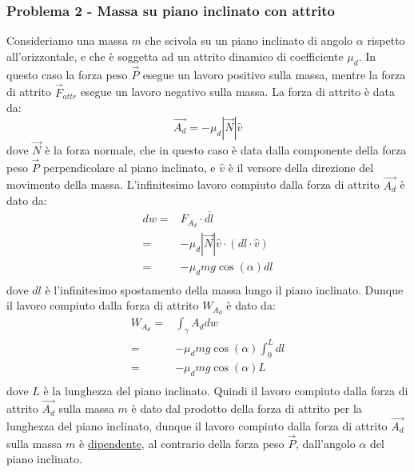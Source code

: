     \subsubsection{Problema 2 - Massa su piano inclinato con attrito}
        Consideriamo una massa $m$ che scivola su un piano inclinato di angolo $\alpha$ rispetto all'orizzontale, e che è soggetta ad un attrito dinamico di coefficiente $\mu_d$.\newline
        In questo caso la forza peso $\vec{P}$ esegue un lavoro positivo sulla massa, mentre la forza di attrito $\vec{F}_{attr}$ esegue un lavoro negativo sulla massa. La forza di attrito è data da:
        $$
            \vec{A_d}= -\mu_d \left|\vec{N}\right|\hat{v}
        $$
        dove $\vec{N}$ è la forza normale, che in questo caso è data dalla componente della forza peso $\vec{P}$ perpendicolare al piano inclinato, e $\hat{v}$ è il versore della direzione del movimento della massa. L'infinitesimo lavoro compiuto dalla forza di attrito $\vec{A_d}$ è dato da:
        $$
            \begin{aligned}
                dw=& F_{A_d} \cdot d\hat{l} \\
                =& -\mu_d \left|\vec{N}\right|\hat{v} \cdot (dl\cdot \hat{v})\\
                =& -\mu_d mg\cos (\alpha) dl\\
            \end{aligned}
        $$
        dove $dl$ è l'infinitesimo spostamento della massa lungo il piano inclinato. Dunque il lavoro compiuto dalla forza di attrito $W_{A_d}$ è dato da:
        $$
            \begin{aligned}
                W_{A_d} =& \int_{\gamma} A_d dw\\
                =& -\mu_d mg\cos(\alpha)\int_0^L dl\\
                =& -\mu_d mg\cos(\alpha) L\\
            \end{aligned}
        $$
        dove $L$ è la lunghezza del piano inclinato. Quindi il lavoro compiuto dalla forza di attrito $\vec{A_d}$ sulla massa $m$ è dato dal prodotto della forza di attrito per la lunghezza del piano inclinato, dunque il lavoro compiuto dalla forza di attrito $\vec{A_d}$ sulla massa $m$ è \underline{dipendente}, al contrario della forza peso $\vec{P}$, dall'angolo $\alpha$ del piano inclinato.
